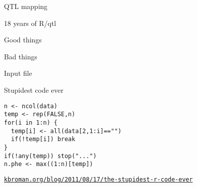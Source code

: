 \documentclass[12pt,t,aspectratio=169]{beamer}
\begin{document}
\begin{frame}[c]{QTL mapping}

\vspace{5mm}
\end{frame}


\begin{frame}[c]{18 years of R/qtl}


\end{frame}




\begin{frame}[c]{}

\centerline{\Large Good things}

\vspace{4mm}


\end{frame}


\begin{frame}{}

\vspace*{16.7mm}

\centerline{\Large Bad things}

\end{frame}


\begin{frame}[c]{Input file}


\end{frame}


\begin{frame}[c,fragile]{Stupidest code ever}

\begin{center}
\begin{minipage}[c]{9.3cm}
\begin{semiverbatim}
\lstset{basicstyle=\normalsize}
\begin{lstlisting}[linewidth=9.3cm]
n <- ncol(data)
temp <- rep(FALSE,n)
for(i in 1:n) {
  temp[i] <- all(data[2,1:i]=="")
  if(!temp[i]) break
}
if(!any(temp)) stop("...")
n.phe <- max((1:n)[temp])
\end{lstlisting}
\end{semiverbatim}
\end{minipage}
\end{center}

\vspace{3mm}

\hfill \href{https://kbroman.org/blog/2011/08/17/the-stupidest-r-code-ever}{\scriptsize \lolit \tt kbroman.org/blog/2011/08/17/the-stupidest-r-code-ever}

\end{frame}
\end{document}
